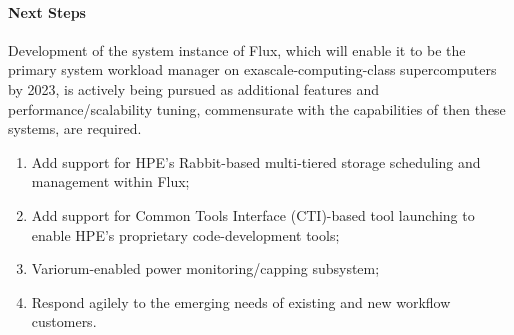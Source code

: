 \paragraph{Next Steps}
Development of the system instance of Flux, which will enable it to
be the primary system workload manager on exascale-computing-class supercomputers
by 2023, is actively being pursued as additional features
and performance/scalability tuning, commensurate with the capabilities
of then these systems, are required.
\begin{enumerate}
    \item Add support for HPE's Rabbit-based multi-tiered storage scheduling and management within Flux;

    \item Add support for Common Tools Interface (CTI)-based tool launching to enable HPE's proprietary code-development tools;

    \item Variorum-enabled power monitoring/capping subsystem;

    \item Respond agilely to the emerging needs of existing and new workflow customers. 

\end{enumerate}

